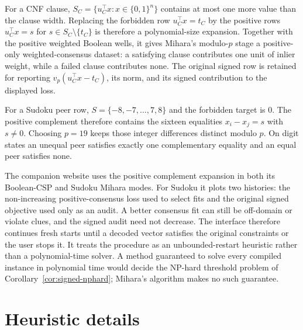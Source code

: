 \documentclass[11pt]{article}
\begin{document}
For a CNF clause, \(S_C=\{u_C^\top x:x\in\{0,1\}^n\}\) contains at most one more value than the clause width. Replacing the forbidden row \(u_C^\top x=t_C\) by the positive rows \(u_C^\top x=s\) for \(s\in S_C\setminus\{t_C\}\) is therefore a polynomial-size expansion. Together with the positive weighted Boolean wells, it gives Mihara's modulo-\(p\) stage a positive-only weighted-consensus dataset: a satisfying clause contributes one unit of inlier weight, while a failed clause contributes none. The original signed row is retained for reporting \(v_p(u_C^\top x-t_C)\), its norm, and its signed contribution to the displayed loss.

For a Sudoku peer row, \(S=\{-8,-7,\ldots,7,8\}\) and the forbidden target is \(0\). The positive complement therefore contains the sixteen equalities \(x_i-x_j=s\) with \(s\ne0\). Choosing \(p=19\) keeps those integer differences distinct modulo \(p\). On digit states an unequal peer satisfies exactly one complementary equality and an equal peer satisfies none.

The companion website uses the positive complement expansion in both its Boolean-CSP and Sudoku Mihara modes. For Sudoku it plots two histories: the non-increasing positive-consensus loss used to select fits and the original signed objective used only as an audit. A better consensus fit can still be off-domain or violate clues, and the signed audit need not decrease. The interface therefore continues fresh starts until a decoded vector satisfies the original constraints or the user stops it. It treats the procedure as an unbounded-restart heuristic rather than a polynomial-time solver. A method guaranteed to solve every compiled instance in polynomial time would decide the NP-hard threshold problem of Corollary~\ref{cor:signed-nphard}; Mihara's algorithm makes no such guarantee.

\section{Heuristic details}
\label{app:heuristics}
\end{document}

